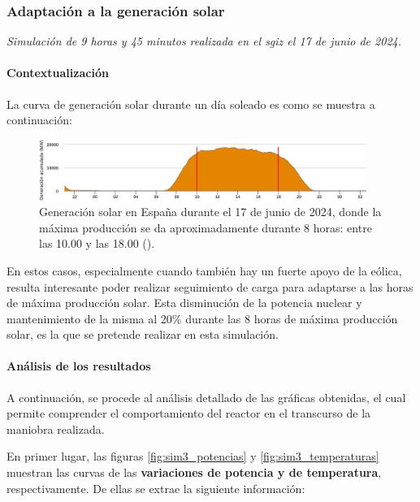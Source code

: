 \subsubsection{Adaptación a la generación solar}

\textit{Simulación de 9 horas y 45 minutos realizada en el \acrshort{sgiz} el 17 de junio de 2024.}

\paragraph{Contextualización}

La curva de generación solar durante un día soleado es como se muestra a continuación:

\begin{figure}[!h]
  \centering
  \includegraphics[width=0.95\textwidth]{content/figures/generacion_solar.png}
  \caption{Generación solar en España durante el 17 de junio de 2024, donde la máxima producción se da aproximadamente durante 8 horas: entre las 10.00 y las 18.00 (\cite{ree_demanda}).}
  \label{fig:generacion_solar}
\end{figure}

En estos casos, especialmente cuando también hay un fuerte apoyo de la eólica, resulta interesante poder realizar seguimiento de carga para adaptarse a las horas de máxima producción solar. Esta disminución de la potencia nuclear y mantenimiento de la misma al 20\% durante las 8 horas de máxima producción solar, es la que se pretende realizar en esta simulación.

\paragraph{Análisis de los resultados}

A continuación, se procede al análisis detallado de las gráficas obtenidas, el cual permite comprender el comportamiento del reactor en el transcurso de la maniobra realizada.

En primer lugar, las figuras \ref{fig:sim3_potencias} y \ref{fig:sim3_temperaturas} muestran las curvas de las \textbf{variaciones de potencia y de temperatura}, respectivamente. De ellas se extrae la siguiente información:

